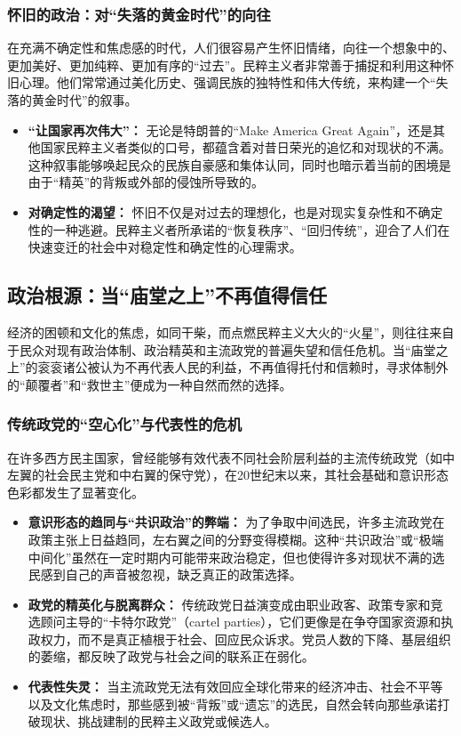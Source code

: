 \documentclass[UTF8, 10pt]{ctexbook}
\begin{document}
\subsubsection{怀旧的政治：对“失落的黄金时代”的向往}
在充满不确定性和焦虑感的时代，人们很容易产生怀旧情绪，向往一个想象中的、更加美好、更加纯粹、更加有序的“过去”。民粹主义者非常善于捕捉和利用这种怀旧心理。他们常常通过美化历史、强调民族的独特性和伟大传统，来构建一个“失落的黄金时代”的叙事。
    \begin{itemize}
        \item \textbf{“让国家再次伟大”：} 无论是特朗普的“Make America Great Again”，还是其他国家民粹主义者类似的口号，都蕴含着对昔日荣光的追忆和对现状的不满。这种叙事能够唤起民众的民族自豪感和集体认同，同时也暗示着当前的困境是由于“精英”的背叛或外部的侵蚀所导致的。
        \item \textbf{对确定性的渴望：} 怀旧不仅是对过去的理想化，也是对现实复杂性和不确定性的一种逃避。民粹主义者所承诺的“恢复秩序”、“回归传统”，迎合了人们在快速变迁的社会中对稳定性和确定性的心理需求。
    \end{itemize}
    
\subsection{政治根源：当“庙堂之上”不再值得信任}
经济的困顿和文化的焦虑，如同干柴，而点燃民粹主义大火的“火星”，则往往来自于民众对现有政治体制、政治精英和主流政党的普遍失望和信任危机。当“庙堂之上”的衮衮诸公被认为不再代表人民的利益，不再值得托付和信赖时，寻求体制外的“颠覆者”和“救世主”便成为一种自然而然的选择。

\subsubsection{传统政党的“空心化”与代表性的危机}
在许多西方民主国家，曾经能够有效代表不同社会阶层利益的主流传统政党（如中左翼的社会民主党和中右翼的保守党），在20世纪末以来，其社会基础和意识形态色彩都发生了显著变化。
    \begin{itemize}
        \item \textbf{意识形态的趋同与“共识政治”的弊端：} 为了争取中间选民，许多主流政党在政策主张上日益趋同，左右翼之间的分野变得模糊。这种“共识政治”或“极端中间化”虽然在一定时期内可能带来政治稳定，但也使得许多对现状不满的选民感到自己的声音被忽视，缺乏真正的政策选择。
        \item \textbf{政党的精英化与脱离群众：} 传统政党日益演变成由职业政客、政策专家和竞选顾问主导的“卡特尔政党”（cartel parties），它们更像是在争夺国家资源和执政权力，而不是真正植根于社会、回应民众诉求。党员人数的下降、基层组织的萎缩，都反映了政党与社会之间的联系正在弱化。
        \item \textbf{代表性失灵：} 当主流政党无法有效回应全球化带来的经济冲击、社会不平等以及文化焦虑时，那些感到被“背叛”或“遗忘”的选民，自然会转向那些承诺打破现状、挑战建制的民粹主义政党或候选人。
    \end{itemize}
\end{document}
